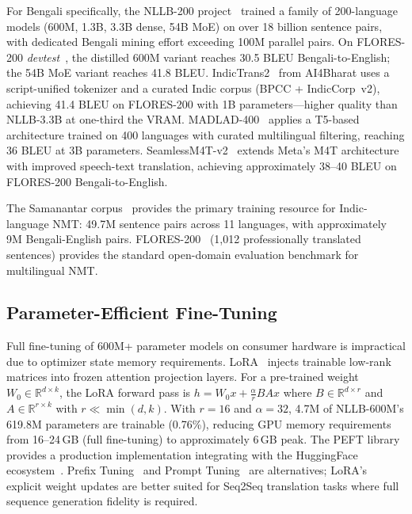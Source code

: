 \documentclass[journal]{IEEEtran}
\begin{document}
For Bengali specifically, the NLLB-200 project~\cite{nllb2022} trained a family
of 200-language models (600M, 1.3B, 3.3B dense, 54B MoE) on over 18 billion
sentence pairs, with dedicated Bengali mining effort exceeding 100M parallel pairs.
On FLORES-200 \textit{devtest}~\cite{nllb2022}, the distilled 600M variant reaches
30.5 BLEU Bengali-to-English; the 54B MoE variant reaches 41.8 BLEU.
IndicTrans2~\cite{gala2023indictrans2} from AI4Bharat uses a script-unified
tokenizer and a curated Indic corpus (BPCC + IndicCorp~v2), achieving 41.4 BLEU
on FLORES-200 with 1B parameters---higher quality than NLLB-3.3B at
one-third the VRAM.
MADLAD-400~\cite{kudugunta2023madlad} applies a T5-based architecture trained on
400 languages with curated multilingual filtering, reaching 36 BLEU at 3B
parameters.
SeamlessM4T-v2~\cite{seamlessm4t2023} extends Meta's M4T architecture with
improved speech-text translation, achieving approximately 38--40 BLEU on
FLORES-200 Bengali-to-English.

The Samanantar corpus~\cite{samanantar2022} provides the primary training resource
for Indic-language NMT: 49.7M sentence pairs across 11 languages, with approximately
9M Bengali-English pairs.
FLORES-200~\cite{nllb2022} (1,012 professionally translated sentences) provides
the standard open-domain evaluation benchmark for multilingual NMT.

\subsection{Parameter-Efficient Fine-Tuning}

Full fine-tuning of 600M+ parameter models on consumer hardware is
impractical due to optimizer state memory requirements.
LoRA~\cite{hu2021lora} injects trainable low-rank matrices into frozen
attention projection layers.
For a pre-trained weight $W_0 \in \mathbb{R}^{d \times k}$, the LoRA forward
pass is $h = W_0 x + \frac{\alpha}{r} B A x$ where $B \in \mathbb{R}^{d \times r}$
and $A \in \mathbb{R}^{r \times k}$ with $r \ll \min(d,k)$.
With $r=16$ and $\alpha=32$, 4.7M of NLLB-600M's 619.8M parameters are trainable
(0.76\%), reducing GPU memory requirements from 16--24\,GB (full fine-tuning) to
approximately 6\,GB peak.
The PEFT library~\cite{peft2022} provides a production implementation integrating
with the HuggingFace ecosystem~\cite{wolf2020transformers}.
Prefix Tuning~\cite{li2021prefix} and Prompt Tuning~\cite{lester2021power} are
alternatives; LoRA's explicit weight updates are better suited for Seq2Seq
translation tasks where full sequence generation fidelity is required.
\end{document}
